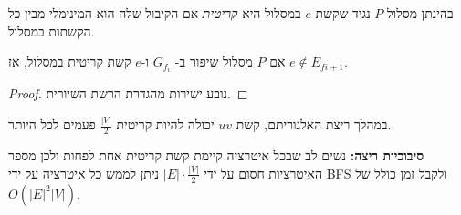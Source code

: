 \begin{definition}
בהינתן מסלול $P$ נגיד שקשת $e$ במסלול היא 
\emph{קריטית}
אם הקיבול שלה הוא המינימלי מבין כל הקשתות במסלול.
\end{definition}

\begin{claim}
אם $P$ מסלול שיפור ב-%
$G_{f_i}$
ו-$e$ קשת קריטית במסלול, אז 
$e \notin E_{f{i + 1}}$.
\end{claim}

\begin{proof}
נובע ישירות מהגדרת הרשת השיורית.
\end{proof}

\begin{corollary}
במהלך ריצת האלגוריתם, קשת
$uv$
יכולה להיות קריטית 
$\frac{|V|}{2}$
פעמים לכל היותר.

\end{corollary}

\textbf{סיבוכיות ריצה:}
נשים לב שבכל איטרציה קיימת קשת קריטית אחת לפחות ולכן מספר האיטרציות חסום על ידי
$|E| \cdot \frac{|V|}{2}$
ניתן לממש כל איטרציה על ידי BFS ולקבל זמן כולל של
$O(|E|^2|V|)$.

